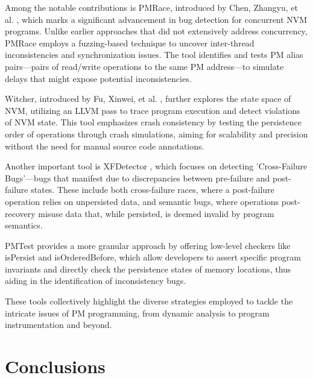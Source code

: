 \documentclass[nonacm,sigplan]{acmart}
\begin{document}
Among the notable contributions is PMRace, introduced by Chen, Zhangyu, et al. \cite{pmrace2022}, which marks a significant advancement in bug detection for concurrent NVM programs. Unlike earlier approaches that did not extensively address concurrency, PMRace employs a fuzzing-based technique to uncover inter-thread inconsistencies and synchronization issues. The tool identifies and tests PM alias pairs—pairs of read/write operations to the same PM address—to simulate delays that might expose potential inconsistencies.

Witcher, introduced by Fu, Xinwei, et al. \cite{witcher2021}, further explores the state space of NVM, utilizing an LLVM pass to trace program execution and detect violations of NVM state. This tool emphasizes crash consistency by testing the persistence order of operations through crash simulations, aiming for scalability and precision without the need for manual source code annotations.

Another important tool is XFDetector \cite{xfdetector2020}, which focuses on detecting 'Cross-Failure Bugs'—bugs that manifest due to discrepancies between pre-failure and post-failure states. These include both cross-failure races, where a post-failure operation relies on unpersisted data, and semantic bugs, where operations post-recovery misuse data that, while persisted, is deemed invalid by program semantics.

PMTest \cite{pmtest2019} provides a more granular approach by offering low-level checkers like isPersist and isOrderedBefore, which allow developers to assert specific program invariants and directly check the persistence states of memory locations, thus aiding in the identification of inconsistency bugs.

These tools collectively highlight the diverse strategies employed to tackle the intricate issues of PM programming, from dynamic analysis to program instrumentation and beyond.


\section{Conclusions}
\label{sec:conclusions}
\end{document}
